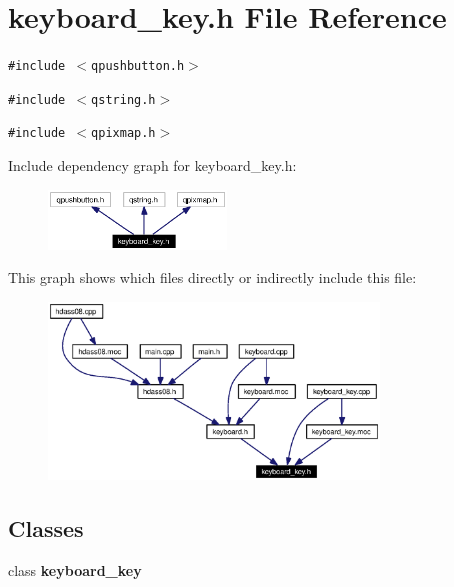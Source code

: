 \section{keyboard\_\-key.h File Reference}
\label{keyboard__key_8h}


{\tt \#include $<$qpushbutton.h$>$}\par
{\tt \#include $<$qstring.h$>$}\par
{\tt \#include $<$qpixmap.h$>$}\par


Include dependency graph for keyboard\_\-key.h:\begin{figure}[H]
\begin{center}
\leavevmode
\includegraphics[width=134pt]{keyboard__key_8h__incl}
\end{center}
\end{figure}


This graph shows which files directly or indirectly include this file:\begin{figure}[H]
\begin{center}
\leavevmode
\includegraphics[width=249pt]{keyboard__key_8h__dep__incl}
\end{center}
\end{figure}
\subsection*{Classes}
\begin{CompactItemize}
\item 
class {\bf keyboard\_\-key}
\end{CompactItemize}
